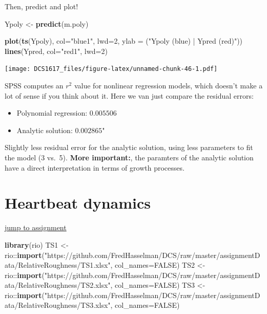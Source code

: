 \documentclass[]{book}
\newenvironment{Shaded}{\begin{snugshade}}{\end{snugshade}}
\newcommand{\KeywordTok}[1]{\textcolor[rgb]{0.13,0.29,0.53}{\textbf{{#1}}}}
\newcommand{\DataTypeTok}[1]{\textcolor[rgb]{0.13,0.29,0.53}{{#1}}}
\newcommand{\DecValTok}[1]{\textcolor[rgb]{0.00,0.00,0.81}{{#1}}}
\newcommand{\StringTok}[1]{\textcolor[rgb]{0.31,0.60,0.02}{{#1}}}
\newcommand{\OtherTok}[1]{\textcolor[rgb]{0.56,0.35,0.01}{{#1}}}
\newcommand{\NormalTok}[1]{{#1}}
\providecommand{\tightlist}{%
  \setlength{\itemsep}{0pt}\setlength{\parskip}{0pt}}
\let\stdsection\section
\renewcommand\section{\newpage\stdsection}
\begin{document}
Then, predict and plot!

\begin{Shaded}
\begin{Highlighting}[]
\NormalTok{Ypoly <-}\StringTok{ }\KeywordTok{predict}\NormalTok{(m.poly)}

\KeywordTok{plot}\NormalTok{(}\KeywordTok{ts}\NormalTok{(Ypoly), }\DataTypeTok{col=}\StringTok{"blue1"}\NormalTok{, }\DataTypeTok{lwd=}\DecValTok{2}\NormalTok{, }\DataTypeTok{ylab =} \NormalTok{(}\StringTok{"Ypoly (blue) | Ypred (red)"}\NormalTok{))}
\KeywordTok{lines}\NormalTok{(Ypred, }\DataTypeTok{col=}\StringTok{"red1"}\NormalTok{, }\DataTypeTok{lwd=}\DecValTok{2}\NormalTok{)}
\end{Highlighting}
\end{Shaded}

\texttt{[image: DCS1617\_files/figure-latex/unnamed-chunk-46-1.pdf]}

SPSS computes an \(r^2\) value for nonlinear regression models, which
doesn't make a lot of sense if you think about it. Here we van just
compare the residual errors:

\begin{itemize}
\tightlist
\item
  Polynomial regression: \(0.005506\)
\item
  Analytic solution: \(0.002865\)"
\end{itemize}

Slightly less residual error for the analytic solution, using less
parameters to fit the model (3 vs.~5). \textbf{More important:}, the
paramters of the analytic solution have a direct interpretation in terms
of growth processes.

\hypertarget{hrvsol}{\section{Heartbeat dynamics}\label{hrvsol}}

\protect\hyperlink{hrv}{\textbar{} jump to assignment \textbar{}}

\begin{Shaded}
\begin{Highlighting}[]
\KeywordTok{library}\NormalTok{(rio)}
\NormalTok{TS1 <-}\StringTok{ }\NormalTok{rio::}\KeywordTok{import}\NormalTok{(}\StringTok{"https://github.com/FredHasselman/DCS/raw/master/assignmentData/RelativeRoughness/TS1.xlsx"}\NormalTok{, }\DataTypeTok{col_names=}\OtherTok{FALSE}\NormalTok{)}
\NormalTok{TS2 <-}\StringTok{ }\NormalTok{rio::}\KeywordTok{import}\NormalTok{(}\StringTok{"https://github.com/FredHasselman/DCS/raw/master/assignmentData/RelativeRoughness/TS2.xlsx"}\NormalTok{, }\DataTypeTok{col_names=}\OtherTok{FALSE}\NormalTok{)}
\NormalTok{TS3 <-}\StringTok{ }\NormalTok{rio::}\KeywordTok{import}\NormalTok{(}\StringTok{"https://github.com/FredHasselman/DCS/raw/master/assignmentData/RelativeRoughness/TS3.xlsx"}\NormalTok{, }\DataTypeTok{col_names=}\OtherTok{FALSE}\NormalTok{)}
\end{Highlighting}
\end{Shaded}
\end{document}
